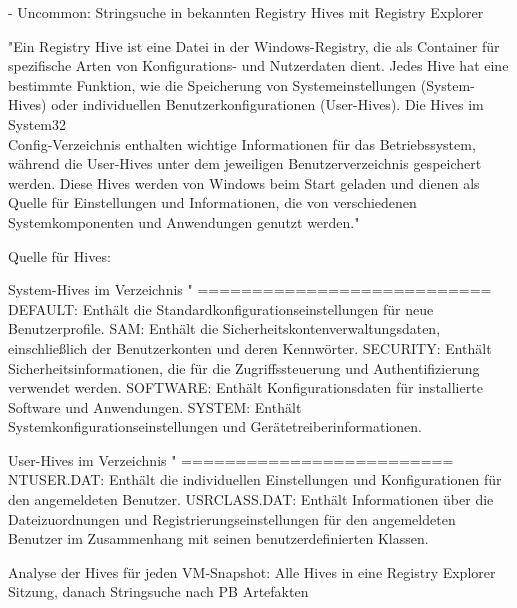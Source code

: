- Uncommon: Stringsuche in bekannten Registry Hives mit Registry Explorer

	"Ein Registry Hive ist eine Datei in der Windows-Registry, die als Container für spezifische Arten von Konfigurations- und Nutzerdaten dient. Jedes Hive hat eine bestimmte Funktion, wie die Speicherung von Systemeinstellungen (System-Hives) oder individuellen Benutzerkonfigurationen (User-Hives). Die Hives im System32\\Config-Verzeichnis enthalten wichtige Informationen für das Betriebssystem, während die User-Hives unter dem jeweiligen Benutzerverzeichnis gespeichert werden. Diese Hives werden von Windows beim Start geladen und dienen als Quelle für Einstellungen und Informationen, die von verschiedenen Systemkomponenten und Anwendungen genutzt werden."	

	Quelle für Hives: %
	
	System-Hives im Verzeichnis "%
	===========================
    DEFAULT: Enthält die Standardkonfigurationseinstellungen für neue Benutzerprofile.
    SAM: Enthält die Sicherheitskontenverwaltungsdaten, einschließlich der Benutzerkonten und deren Kennwörter.
    SECURITY: Enthält Sicherheitsinformationen, die für die Zugriffssteuerung und Authentifizierung verwendet werden.
    SOFTWARE: Enthält Konfigurationsdaten für installierte Software und Anwendungen.
    SYSTEM: Enthält Systemkonfigurationseinstellungen und Gerätetreiberinformationen.

	User-Hives im Verzeichnis "%
	=========================
    NTUSER.DAT: Enthält die individuellen Einstellungen und Konfigurationen für den angemeldeten Benutzer. 
    USRCLASS.DAT: Enthält Informationen über die Dateizuordnungen und Registrierungseinstellungen für den angemeldeten Benutzer im Zusammenhang mit seinen benutzerdefinierten Klassen. 

	Analyse der Hives für jeden VM-Snapshot: Alle Hives in eine Registry Explorer Sitzung, danach Stringsuche nach PB Artefakten	

